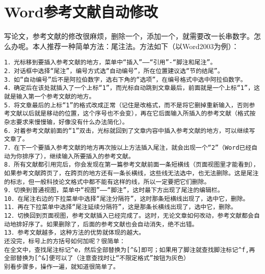 \section{Word参考文献自动修改}
写论文，参考文献的修改很麻烦，删除一个，添加一个，就需要改一长串数字。怎么办呢。本人推荐一种简单方法：尾注法。方法如下（以Word2003为例）：
\begin{verbatim} 
1．光标移到要插入参考文献的地方，菜单中“插入”——“引用”-“脚注和尾注”。   
2．对话框中选择“尾注”，编号方式选“自动编号”，所在位置建议选“节的结尾”。   
3．如“自动编号”后不是阿拉伯数字，选右下角的“选项”，在编号格式中选中阿拉伯数字。   
4．确定后在该处就插入了一个上标“1”，而光标自动跳到文章最后，前面就是一个上标“1”，这就是输入第一个参考文献的地方。   
5．将文章最后的上标“1”的格式改成正常（记住是改格式，而不是将它删掉重新输入，否则参考文献以后就是移动的位置，这个序号也不会变），再在它后面输入所插入的参考文献（格式按杂志要求来慢慢输，好像没有什么办法简化）。   
6．对着参考文献前面的“1”双击，光标就回到了文章内容中插入参考文献的地方，可以继续写文章了。   
7．在下一个要插入参考文献的地方再次按以上方法插入尾注，就会出现一个“2”（Word已经自动为你排序了），继续输入所要插入的参考文献。   
8．所有文献都引用完后，你会发现在第一篇参考文献前面一条短横线（页面视图里才能看到），如果参考文献跨页了，在跨页的地方还有一条长横线，这些线无法选中，也无法删除。这是尾注的标志，但一般科技论文格式中都不能有这样的线，所以一定要把它们删除。   
9．切换到普通视图，菜单中“视图”——“脚注”，这时最下方出现了尾注的编辑栏。   
10．在尾注右边的下拉菜单中选择“尾注分隔符”，这时那条短横线出现了，选中它，删除。   
11．再在下拉菜单中选择“尾注延续分隔符”，这是那条长横线出现了，选中它，删除。   
12．切换回到页面视图，参考文献插入已经完成了。这时，无论文章如何改动，参考文献都会自动地排好序了。如果删除了，后面的参考文献也会自动消失，绝不出错。   
13．参考文献越多，这种方法的优势就体现的越大。
还没完，标号上的方括号如何加呢？很简单：
在全文中，查找尾注标记^e，然后全部替换为[^&]即可；如果用了脚注就查找脚注标记^f,再全部替换为[^&]便可以了（注意查找时让“不限定格式”按钮为灰色）
别看步骤多，操作一遍，就知道很简单了。
\end{verbatim}
